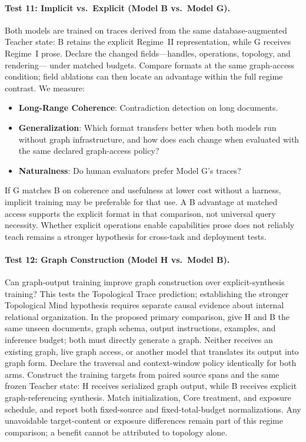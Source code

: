 \documentclass[11pt]{article}
\begin{document}
\paragraph{Test 11: Implicit vs.\ Explicit (Model B vs.\ Model G).}
Both models are trained on traces derived from the same database-augmented
Teacher state: B retains the explicit Regime~II representation, while G
receives Regime~I prose. Declare the changed fields---handles, operations, topology, and rendering---
under matched budgets. Compare formats at the same graph-access condition;
field ablations can then locate an advantage within the full regime contrast. We measure:
\begin{itemize}
    \item \textbf{Long-Range Coherence}: Contradiction detection on long
    documents.
    \item \textbf{Generalization}: Which format transfers better when both
    models run without graph infrastructure, and how does each change when
    evaluated with the same declared graph-access policy?
    \item \textbf{Naturalness}: Do human evaluators prefer Model G's traces?
\end{itemize}
If G matches B on coherence and usefulness at lower cost without a harness,
implicit training may be preferable for that use. A B advantage at matched
access supports the explicit format in that comparison, not universal query
necessity. Whether explicit operations enable capabilities prose does not
reliably teach remains a stronger hypothesis for cross-task and deployment
tests.

\paragraph{Test 12: Graph Construction (Model H vs.\ Model B).}
Can graph-output training improve graph construction over explicit-synthesis
training? This tests the Topological Trace prediction; establishing the stronger
Topological Mind hypothesis requires separate causal evidence about internal
relational organization. In the proposed primary comparison, give H and B the same unseen
documents, graph schema, output instructions, examples, and inference budget;
both must directly generate a graph. Neither receives an existing graph, live
graph access, or another model that translates its output into graph form.
Declare the traversal and context-window policy identically for both arms.
Construct the training targets from paired source spans and the same frozen
Teacher state: H receives serialized graph output, while B receives explicit
graph-referencing synthesis. Match initialization, Core treatment, and exposure
schedule, and report both fixed-source and fixed-total-budget normalizations.
Any unavoidable target-content or exposure differences remain part of this
regime comparison; a benefit cannot be attributed to topology alone.
\end{document}
